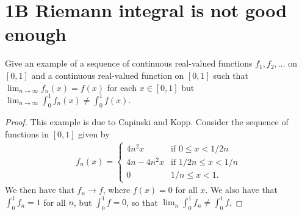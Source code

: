 \section{1B Riemann integral is not good enough}

\begin{exercise}{5}
Give an example of a sequence of continuous real-valued functions $f_1,f_2,\dots$ on $[0,1]$ and a continuous real-valued function on $[0,1]$ such that $\lim_{n\to\infty} f_n(x)= f(x)$ for each $x\in [0,1]$ but $\lim_{n\to\infty}\int_0^1 f_n(x) \neq \int_0^1 f(x)$.
\end{exercise}
\begin{proof}
This example is due to Capinski and Kopp.
Consider the sequence of functions in $[0,1]$ given by
\begin{align*}
    f_n(x) =
    \begin{cases}
        4n^2x &\text{if }0\leq x<1/2n\\
        4n-4n^2x &\text{if }1/2n\leq x < 1/n\\
        0 &1/n\leq x < 1.
    \end{cases}
\end{align*}
We then have that $f_n\to f$, where $f(x)=0$ for all $x$.
We also have that $\int_0^1 f_n=1$ for all $n$, but $\int_0^1 f=0$, so that $\lim_n \int_0^1 f_n \neq \int_0^1 f$.
\end{proof} 
